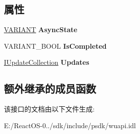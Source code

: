 \subsection*{属性}
\begin{DoxyCompactItemize}
\item 
\mbox{\label{interface_w_u_api_lib_1_1_i_download_job_a253ab8d4d18168d206a14886ee8ff7ba}} 
\hyperlink{structtag_v_a_r_i_a_n_t}{V\+A\+R\+I\+A\+NT} {\bfseries Async\+State}
\item 
\mbox{\label{interface_w_u_api_lib_1_1_i_download_job_a92c37a2b4f8745a1c3d3a66630d0a83a}} 
V\+A\+R\+I\+A\+N\+T\+\_\+\+B\+O\+OL {\bfseries Is\+Completed}
\item 
\mbox{\label{interface_w_u_api_lib_1_1_i_download_job_aed5aec4de3c5bddbec429a3fd32b4f15}} 
\hyperlink{interface_w_u_api_lib_1_1_i_update_collection}{I\+Update\+Collection} {\bfseries Updates}
\end{DoxyCompactItemize}
\subsection*{额外继承的成员函数}


该接口的文档由以下文件生成\+:\begin{DoxyCompactItemize}
\item 
E\+:/\+React\+O\+S-\/0../sdk/include/psdk/wuapi.\+idl\end{DoxyCompactItemize}
